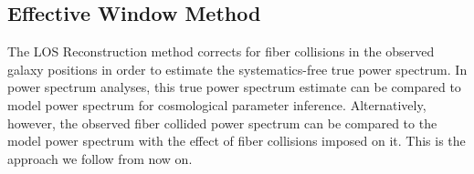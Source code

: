                                                                                                                                                                                                                                                                          \subsection{Effective Window Method} \label{sec:fourier}
                                                                                                                                                                                                                                                                         The LOS Reconstruction method corrects for fiber collisions in the observed galaxy positions 
                                                                                                                                                                                                                                                                          in order to estimate the systematics-free true power 
                                                                                                                                                                                                                                                                          spectrum. In power spectrum analyses, this true power spectrum estimate
                                                                                                                                                                                                                                                                          can be compared to model power spectrum for cosmological parameter inference. 
                                                                                                                                                                                                                                                                          Alternatively, however, the observed fiber collided power spectrum can be 
                                                                                                                                                                                                                                                                          compared to the model power spectrum with the effect of fiber collisions imposed 
                                                                                                                                                                                                                                                                          on it. This is the approach we follow from now on.

